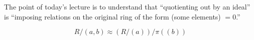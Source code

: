 
The point of today's lecture is to understand that ``quotienting out by an ideal'' is ``imposing relations on the original ring of the form (some elements) $ = 0$.''

\begin{lem}
	\[R/(a, b) \approx (R / (a)) \big/ \pi((b))\]
\end{lem}
